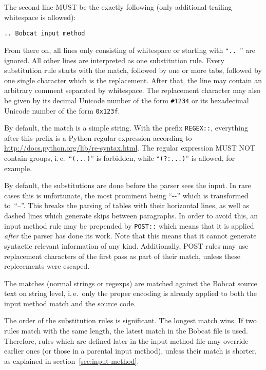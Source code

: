\documentclass[12pt,openany]{book}
\begin{document}
The second line MUST be the exactly following (only additional trailing
whitespace is allowed):

\begin{lstlisting}
.. Bobcat input method
\end{lstlisting}

From there on, all lines only consisting of whitespace or starting with
``\verb*|.. |'' are ignored.  All other lines are interpreted as one
substitution rule.  Every substitution rule starts with the match, followed by
one or more tabs, followed by one single character which is the replacement.
After that, the line may contain an arbitrary comment separated by whitespace.
The replacement character may also be given by its decimal Unicode number of
the form \verb|#1234| or its hexadecimal Unicode number of the form
\verb|0x123f|.

By default, the match is a simple string.  With the prefix \verb|REGEX::|,
everything after this prefix is a Python regular expression according to
\url{http://docs.python.org/lib/re-syntax.html}.  The regular expression MUST
NOT contain groups, i.\,e.\ ``\verb|(...)|'' is forbidden, while
``\verb|(?:...)|'' is allowed, for example.

By default, the substitutions are done before the parser sees the input.  In
rare cases this is unfortunate, the most prominent being ``\mbox{-{}-}'' which
is transformed to~``--''.  This breaks the parsing of tables with their
horizontal lines, as well as dashed lines which generate skips between
paragraphs.  In order to avoid this, an input method rule may be prepended by
\verb|POST::| which means that it is applied \emph{after} the parser has done
its work.  Note that this means that it cannot generate syntactic relevant
information of any kind.  Additionally, POST rules may use replacement
characters of the first pass as part of their match, unless these replecements
were escaped.

The matches (normal strings or regexps) are matched against the Bobcat source
text on string level, i.\,e.\ only the proper encoding is already applied to
both the input method match and the source code.

The order of the substitution rules is significant.  The longest match wins.
If two rules match with the same length, the latest match in the Bobcat file is
used.  Therefore, rules which are defined later in the input method file may
override earlier ones (or those in a parental input method), unless their match
is shorter, as explained in section~\ref{sec:input-method}.
\end{document}
